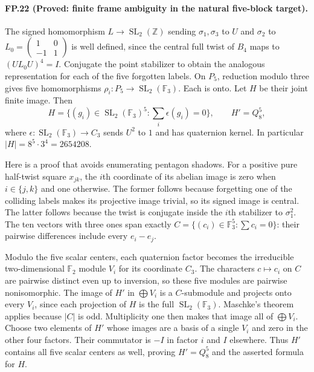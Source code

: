 \paragraph{FP.22 (Proved: finite frame ambiguity in the natural five-block target).}
The signed homomorphism $L\to\operatorname{SL}_2(\mathbb Z)$ sending
$\sigma_1,\sigma_3$ to $U$ and $\sigma_2$ to $L_0=
\left(\begin{smallmatrix}1&0\\-1&1\end{smallmatrix}\right)$ is well defined,
since the central full twist of $B_4$ maps to $(UL_0U)^4=I$.
Conjugate the point stabilizer to obtain the analogous representation for
each of the five forgotten labels. On $P_5$, reduction modulo three gives
five homomorphisms $\rho_i:P_5\to\operatorname{SL}_2(\mathbb F_3)$.
Each is onto. Let $H$ be their joint finite image. Then
\[
 H=\{(g_i)\in\operatorname{SL}_2(\mathbb F_3)^5:
          \textstyle\sum_i\epsilon(g_i)=0\},\qquad
 H'=Q_8^5,
\]
where $\epsilon:\operatorname{SL}_2(\mathbb F_3)\to C_3$ sends
$U^2$ to $1$ and has quaternion kernel. In particular
$|H|=8^5\cdot3^4=2654208$.

Here is a proof that avoids enumerating pentagon shadows. For a positive
pure half-twist square $x_{jk}$, the $i$th coordinate of its abelian image
is zero when $i\in\{j,k\}$ and one otherwise. The former follows because
forgetting one of the colliding labels makes its projective image trivial,
so its signed image is central. The latter follows because the twist is
conjugate inside the $i$th stabilizer to $\sigma_1^2$.
The ten vectors with three ones span exactly
$C=\{(c_i)\in\mathbb F_3^5:\sum c_i=0\}$: their pairwise differences
include every $e_i-e_j$.

Modulo the five scalar centers, each quaternion factor becomes the
irreducible two-dimensional $\mathbb F_2$ module $V_i$ for its coordinate
$C_3$. The characters $c\mapsto c_i$ on $C$ are pairwise distinct even
up to inversion, so these five modules are pairwise nonisomorphic.
The image of $H'$ in $\bigoplus V_i$ is a $C$-submodule and projects onto
every $V_i$, since each projection of $H$ is the full
$\operatorname{SL}_2(\mathbb F_3)$. Maschke's theorem applies because
$|C|$ is odd. Multiplicity one then makes that image all of
$\bigoplus V_i$. Choose two elements of $H'$ whose images are a basis
of a single $V_i$ and zero in the other four factors. Their commutator is
$-I$ in factor $i$ and $I$ elsewhere. Thus $H'$ contains all five scalar
centers as well, proving $H'=Q_8^5$ and the asserted formula for $H$.

